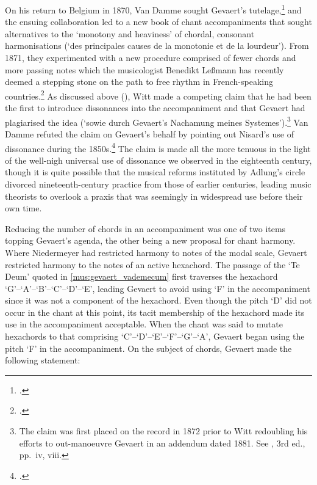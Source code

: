On his return to Belgium in 1870, Van Damme sought Gevaert's tutelage,\footcite[p.~13 n.~1]{VanDammeaccompagnementplainchant1881} and the ensuing collaboration led to a new book of chant accompaniments that sought alternatives to the `monotony and heaviness' of chordal, consonant harmonisations (`des principales causes de la monotonie et de la lourdeur').
From 1871, they experimented with a new procedure comprised of fewer chords and more passing notes which the musicologist Benedikt Leßmann has recently deemed a stepping stone on the path to free rhythm in French-speaking countries.\footcite[139]{LessmannAllTheseRhythms2008}
As discussed above (), Witt made a competing claim that he had been the first to introduce dissonances into the accompaniment and that Gevaert had plagiarised the idea (`sowie durch Gevaert's Nachamung meines Systemes').\footnote{The claim was first placed on the record in 1872 prior to Witt redoubling his efforts to out-manoeuvre Gevaert in an addendum dated 1881. See \cite{WittOrganumcomitansad1881}, 3rd ed., pp.~iv, viii.}
Van Damme refuted the claim on Gevaert's behalf by pointing out Nisard's use of dissonance during the 1850s.\footcite[35]{VanDammelegende1886}
The claim is made all the more tenuous in the light of the well-nigh universal use of dissonance we observed in the eighteenth century, though it is quite possible that the musical reforms instituted by Adlung's circle divorced nineteenth-century practice from those of earlier centuries, leading music theorists to overlook a praxis that was seemingly in widespread use before their own time.

\label{ln:gevaert_new}%
Reducing the number of chords in an accompaniment was one of two items topping Gevaert's agenda, the other being a new proposal for chant harmony.
Where Niedermeyer had restricted harmony to notes of the modal scale, Gevaert restricted harmony to the notes of an active hexachord.
The passage of the `Te Deum' quoted in \cref{mus:gevaert_vademecum} first traverses the hexachord `G'--`A'--`B'--`C'--`D'--`E', leading Gevaert to avoid using `F' in the accompaniment since it was not a component of the hexachord.
Even though the pitch `D' did not occur in the chant at this point, its tacit membership of the hexachord made its use in the accompaniment acceptable.
When the chant was said to mutate hexachords to that comprising `C'--`D'--`E'--`F'--`G'--`A', Gevaert began using the pitch `F' in the accompaniment.
On the subject of chords, Gevaert made the following statement:
\pagebreak{}

